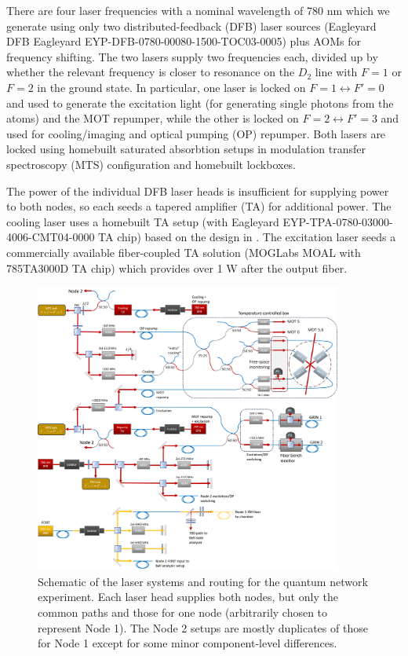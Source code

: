 There are four laser frequencies with a nominal wavelength of 780 nm which we generate using only two distributed-feedback (DFB) laser sources (Eagleyard DFB Eagleyard EYP-DFB-0780-00080-1500-TOC03-0005) plus AOMs for frequency shifting. The two lasers supply two frequencies each, divided up by whether the relevant frequency is closer to resonance on the $D_2$ line with $F=1$ or $F=2$ in the ground state. In particular, one laser is locked on $F=1 \leftrightarrow F'=0$ and used to generate the excitation light (for generating single photons from the atoms) and the MOT repumper, while the other is locked on $F=2 \leftrightarrow F'=3$ and used for cooling/imaging and optical pumping (OP) repumper. Both lasers are locked using homebuilt saturated absorbtion setups in modulation transfer spectroscopy (MTS) configuration and homebuilt lockboxes.

The power of the individual DFB laser heads is insufficient for supplying power to both nodes, so each seeds a tapered amplifier (TA) for additional power. The cooling laser uses a homebuilt TA setup (with Eagleyard EYP-TPA-0780-03000-4006-CMT04-0000 TA chip) based on the design in \cite{kangara2014design}. The excitation laser seeds a commercially available fiber-coupled TA solution (MOGLabs MOAL with 785TA3000D TA chip) which provides over 1 W after the output fiber.

\begin{figure}[h!]
    \centering
    \includegraphics[width=0.9\textwidth]{Images/quantum_network_lasers_schematic.png}
    \caption{Schematic of the laser systems and routing for the quantum network experiment. Each laser head supplies both nodes, but only the common paths and those for one node (arbitrarily chosen to represent Node 1). The Node 2 setups are mostly duplicates of those for Node 1 except for some minor component-level differences.}
    \label{fig:all_lasers_schematic}
\end{figure}

